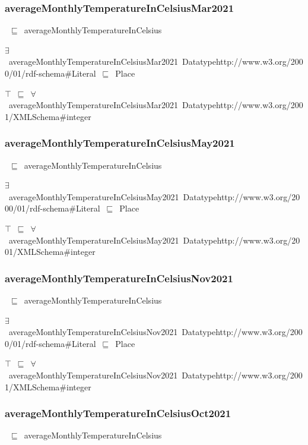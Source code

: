 \documentclass{article}
\begin{document}
\subsubsection*{averageMonthlyTemperatureInCelsiusMar2021}

~\ensuremath{\sqsubseteq}~averageMonthlyTemperatureInCelsius

\ensuremath{\exists}~averageMonthlyTemperatureInCelsiusMar2021~Datatypehttp://www.w3.org/2000/01/rdf-schema#Literal~\ensuremath{\sqsubseteq}~Place

\ensuremath{\top}~\ensuremath{\sqsubseteq}~\ensuremath{\forall}~averageMonthlyTemperatureInCelsiusMar2021~Datatypehttp://www.w3.org/2001/XMLSchema#integer

\subsubsection*{averageMonthlyTemperatureInCelsiusMay2021}

~\ensuremath{\sqsubseteq}~averageMonthlyTemperatureInCelsius

\ensuremath{\exists}~averageMonthlyTemperatureInCelsiusMay2021~Datatypehttp://www.w3.org/2000/01/rdf-schema#Literal~\ensuremath{\sqsubseteq}~Place

\ensuremath{\top}~\ensuremath{\sqsubseteq}~\ensuremath{\forall}~averageMonthlyTemperatureInCelsiusMay2021~Datatypehttp://www.w3.org/2001/XMLSchema#integer

\subsubsection*{averageMonthlyTemperatureInCelsiusNov2021}

~\ensuremath{\sqsubseteq}~averageMonthlyTemperatureInCelsius

\ensuremath{\exists}~averageMonthlyTemperatureInCelsiusNov2021~Datatypehttp://www.w3.org/2000/01/rdf-schema#Literal~\ensuremath{\sqsubseteq}~Place

\ensuremath{\top}~\ensuremath{\sqsubseteq}~\ensuremath{\forall}~averageMonthlyTemperatureInCelsiusNov2021~Datatypehttp://www.w3.org/2001/XMLSchema#integer

\subsubsection*{averageMonthlyTemperatureInCelsiusOct2021}

~\ensuremath{\sqsubseteq}~averageMonthlyTemperatureInCelsius
\end{document}
